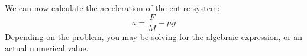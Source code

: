 We can now
calculate the acceleration of the entire system:
\begin{equation*}
  a=\frac FM-\mu g
\end{equation*}
Depending on the problem, you may be solving for the algebraic expression, or
an actual numerical value.

%
%
